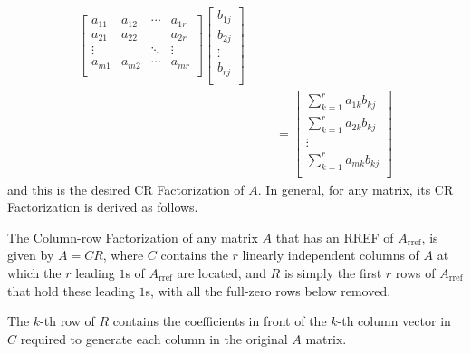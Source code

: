 {\begin{align*}
\begin{bmatrix}
a_{11} & a_{12} & \cdots & a_{1r} \\
a_{21} & a_{22} & & a_{2r} \\
\vdots & & \ddots & \vdots \\
a_{m1} & a_{m2} & \cdots & a_{mr} \\
\end{bmatrix}
\begin{bmatrix}
b_{1j} \\
b_{2j} \\
\vdots \\
b_{rj} \\
\end{bmatrix} \\
& & &=
\begin{bmatrix}
\sum_{k=1}^r a_{1k}b_{kj} \\
\sum_{k=1}^r a_{2k}b_{kj} \\
\vdots \\
\sum_{k=1}^r a_{mk}b_{kj} \\
\end{bmatrix} 
\end{align*}} and this is the desired CR Factorization of $A$. In general, for any matrix, its CR Factorization is derived as follows.
\begin{proper}[CR Factorization]
\label{proper:CRFactor}
The Column-row Factorization of any matrix $A$ that has an RREF of $A_{\text{rref}}$, is given by $A = CR$, where $C$ contains the $r$ linearly independent columns of $A$ at which the $r$ leading $1$s of $A_{\text{rref}}$ are located, and $R$ is simply the first $r$ rows of $A_{\text{rref}}$ that hold these leading $1$s, with all the full-zero rows below removed.
\end{proper}
The $k$-th row of $R$ contains the coefficients in front of the $k$-th column vector in $C$ required to generate each column in the original $A$ matrix.

